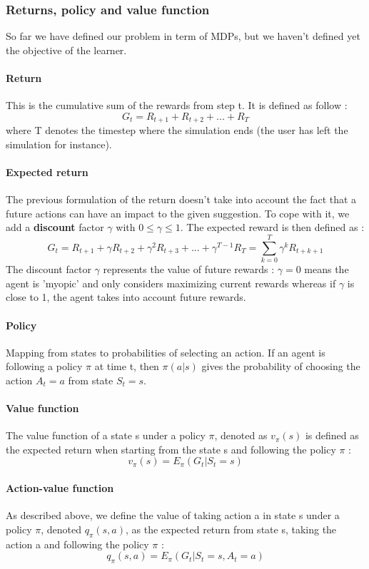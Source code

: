 \documentclass[a4paper]{article}
\begin{document}
	\subsubsection{Returns, policy and value function}

So far we have defined our problem in term of MDPs, but we haven't defined yet the objective of the learner. 

\paragraph{Return} This is the cumulative sum of the rewards from step t. It is defined as follow : 
\[
G_t =  R_{t+1} + R_{t+2} + ... + R_{T} 
\] where T denotes the timestep where the simulation ends (the user has left the simulation for instance). \\
\paragraph{Expected return} The previous formulation of the return doesn't take into account the fact that a future actions can have an impact to the given suggestion. To cope with it, we add a \textbf{discount} factor $\gamma$ with $0 \le \gamma \le 1$. The expected reward is then defined as : 
\[  G_t = R_{t+1} + \gamma R_{t+2} + \gamma^ 2 R_{t+3} + ... + \gamma^{T-1} R_{T} = \sum_{k=0}^{T}\gamma^k R_{t+k+1}            \]
The discount factor $\gamma$ represents the value of future rewards : $\gamma = 0$ means the agent is 'myopic' and only considers maximizing current rewards whereas if $\gamma$ is close to 1, the agent takes into account future rewards. 


\paragraph{Policy } Mapping from states to probabilities of selecting an action. If an agent is following a policy $\pi$ at time t, then $\pi(a|s)$ gives the probability of choosing the action $A_t = a$ from state $S_t = s$.

\paragraph{Value function} The value function of a state s under a policy $\pi$, denoted as $v_{\pi}(s)$ is defined as the expected return when starting from the state s and following the policy $\pi$ :  
\[ 
v_{\pi}(s) = E_{\pi}(G_t | S_t = s) 
\]
\paragraph{Action-value function} As described above, we define the value of taking action a in state s under a policy $\pi$, denoted $q_{\pi}(s,a) $, as the expected return from state s, taking the action a and following the policy $\pi$ : 
\[ q_{\pi}(s,a) = E_{\pi}(G_t | S_t = s, A_t = a) \] 
\end{document}

